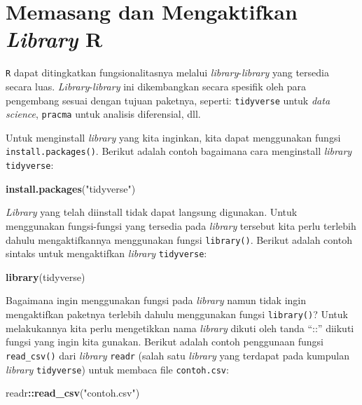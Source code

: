 \documentclass[]{book}
\newenvironment{Shaded}{\begin{snugshade}}{\end{snugshade}}
\newcommand{\KeywordTok}[1]{\textcolor[rgb]{0.13,0.29,0.53}{\textbf{#1}}}
\newcommand{\NormalTok}[1]{#1}
\newcommand{\OperatorTok}[1]{\textcolor[rgb]{0.81,0.36,0.00}{\textbf{#1}}}
\newcommand{\StringTok}[1]{\textcolor[rgb]{0.31,0.60,0.02}{#1}}
\theoremstyle{definition}
\theoremstyle{definition}
\theoremstyle{definition}
\theoremstyle{remark}
\begin{document}
\hypertarget{installlibraryR}{%
\section{\texorpdfstring{Memasang dan Mengaktifkan \emph{Library} R}{Memasang dan Mengaktifkan Library R}}\label{installlibraryR}}

\texttt{R} dapat ditingkatkan fungsionalitasnya melalui \emph{library}-\emph{library} yang tersedia secara luas. \emph{Library}-\emph{library} ini dikembangkan secara spesifik oleh para pengembang sesuai dengan tujuan paketnya, seperti: \texttt{tidyverse} untuk \emph{data science}, \texttt{pracma} untuk analisis diferensial, dll.

Untuk menginstall \emph{library} yang kita inginkan, kita dapat menggunakan fungsi \texttt{install.packages()}. Berikut adalah contoh bagaimana cara menginstall \emph{library} \texttt{tidyverse}:

\begin{Shaded}
\begin{Highlighting}[]
\KeywordTok{install.packages}\NormalTok{(}\StringTok{"tidyverse"}\NormalTok{)}
\end{Highlighting}
\end{Shaded}

\emph{Library} yang telah diinstall tidak dapat langsung digunakan. Untuk menggunakan fungsi-fungsi yang tersedia pada \emph{library} tersebut kita perlu terlebih dahulu mengaktifkannya menggunakan fungsi \texttt{library()}. Berikut adalah contoh sintaks untuk mengaktifkan \emph{library} \texttt{tidyverse}:

\begin{Shaded}
\begin{Highlighting}[]
\KeywordTok{library}\NormalTok{(tidyverse)}
\end{Highlighting}
\end{Shaded}

Bagaimana ingin menggunakan fungsi pada \emph{library} namun tidak ingin mengaktifkan paketnya terlebih dahulu menggunakan fungsi \texttt{library()}? Untuk melakukannya kita perlu mengetikkan nama \emph{library} dikuti oleh tanda ``::'' diikuti fungsi yang ingin kita gunakan. Berikut adalah contoh penggunaan fungsi \texttt{read\_csv()} dari \emph{library} \texttt{readr} (salah satu \emph{library} yang terdapat pada kumpulan \emph{library} \texttt{tidyverse}) untuk membaca file \texttt{contoh.csv}:

\begin{Shaded}
\begin{Highlighting}[]
\NormalTok{readr}\OperatorTok{::}\KeywordTok{read_csv}\NormalTok{(}\StringTok{"contoh.csv"}\NormalTok{)}
\end{Highlighting}
\end{Shaded}
\end{document}

